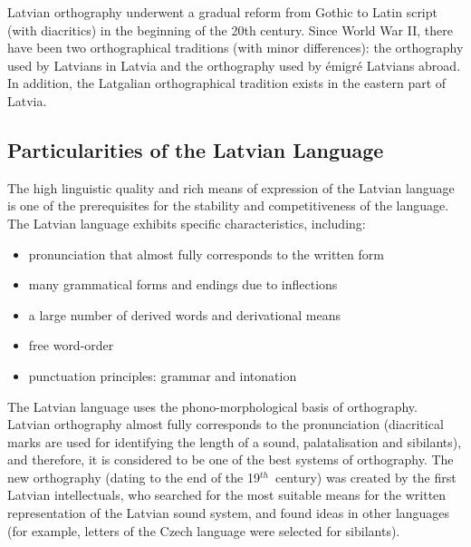 \begin{multicols}{2}
Latvian orthography underwent a gradual reform from Gothic to Latin script (with diacritics) in the beginning of the 20th century.
Since World War II, there have been two orthographical traditions (with minor differences): the orthography used by Latvians in Latvia and the orthography used by émigré Latvians abroad.
In addition, the Latgalian orthographical tradition exists in the eastern part of Latvia.

\subsection{Particularities of the Latvian Language}


The high linguistic quality and rich means of expression of the Latvian language is one of the prerequisites for the stability and competitiveness of the language.  The Latvian language exhibits specific characteristics, including:

\begin{itemize}
\item pronunciation that almost fully corresponds to the written form
\item many grammatical forms and endings due to inflections
\item a large number of derived words and derivational means
\item free word-order
\item punctuation principles: grammar and intonation
\end{itemize}

The Latvian language uses the phono-morphological basis of orthography.  Latvian orthography almost fully corresponds to the pronunciation (diacritical marks are used for identifying the length of a sound, palatalisation and sibilants), and therefore, it is considered to be one of the best systems of orthography.  The new orthography (dating to the end of the 19${}^{th}$~century) was created by the first Latvian intellectuals, who searched for the most suitable means for the written representation of the Latvian sound system, and found ideas in other languages (for example, letters of the Czech language were selected for sibilants).



\end{multicols}
